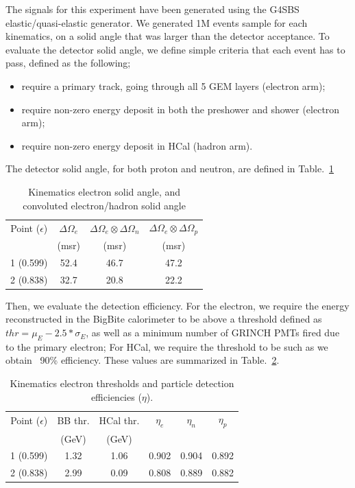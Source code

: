 The signals for this experiment have been generated using the G4SBS elastic/quasi-elastic generator. 
We generated 1M events sample for each kinematics, on a solid angle that was larger than the detector acceptance.
To evaluate the detector solid angle, we define simple criteria that each event has to pass, defined as the following;
%
\begin{itemize}
\item{require a primary track, going through all 5 GEM layers (electron arm);}
\item{require non-zero energy deposit in both the preshower and shower (electron arm);}
\item{require non-zero energy deposit in HCal (hadron arm).}
\end{itemize}
%
The detector solid angle, for both proton and neutron, are defined in Table.~\ref{tab:kinExpParams}
%
\begin{center}
\begin{table}[h]
\begin{tabular}{|c|c|c|c|}
\hline
Point ($\epsilon$) & $\Delta\Omega_e$ & $\Delta\Omega_e \otimes \Delta\Omega_n$ & $\Delta\Omega_e \otimes \Delta\Omega_p$ \\
 & (msr) & (msr) & (msr) \\
\hline
1 (0.599) & 52.4 & 46.7 & 47.2 \\
\hline
2 (0.838) & 32.7 & 20.8 & 22.2 \\
\hline
\end{tabular} 
\caption{Kinematics electron solid angle, and convoluted electron/hadron solid angle}
\label{tab:kinExpParams}
\end{table}
\end{center}
%
Then, we evaluate the detection efficiency. For the electron, we require the energy reconstructed in the BigBite calorimeter to be above a threshold defined as $thr = \mu_E- 2.5* \sigma_E$, as well as a minimum number of GRINCH PMTs fired due to the primary electron; For HCal, we require the threshold to be such as we obtain ~90\% efficiency. These values are summarized in Table.~\ref{tab:kinEffs}.
%
\begin{center}
\begin{table}[h]
\begin{tabular}{|c|c|c|c|c|c|}
\hline
Point ($\epsilon$) & BB thr. & HCal thr. & $\eta_{e}$ & $\eta_{n}$ & $\eta_{p}$ \\
 & (GeV) & (GeV) &  &  &  \\
\hline
1 (0.599) & 1.32 & 1.06 & 0.902 & 0.904 & 0.892 \\ 
\hline
2 (0.838) & 2.99 & 0.09 & 0.808 & 0.889 & 0.882 \\
\hline
\end{tabular} 
\caption{Kinematics electron thresholds and particle detection efficiencies ($\eta$).}
\label{tab:kinEffs}
\end{table}
\end{center}
%

